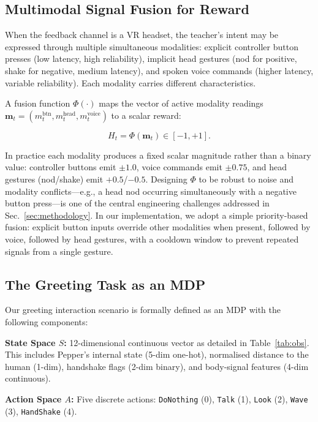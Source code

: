 \documentclass[../report.tex]{subfiles}
\begin{document}
    \subsection{Multimodal Signal Fusion for Reward}

    When the feedback channel is a VR headset, the teacher's intent may be expressed through multiple simultaneous modalities: explicit controller button presses (low latency, high reliability), implicit head gestures (nod for positive, shake for negative, medium latency), and spoken voice commands (higher latency, variable reliability). Each modality carries different characteristics.

    A fusion function $\Phi(\cdot)$ maps the vector of active modality readings $\mathbf{m}_t = (m^{\text{btn}}_t, m^{\text{head}}_t, m^{\text{voice}}_t)$ to a scalar reward:

    \begin{equation}
        H_t = \Phi(\mathbf{m}_t) \in [-1, +1].
        \label{eq:fusion}
    \end{equation}

    In practice each modality produces a fixed scalar magnitude rather than a binary value: controller buttons emit $\pm1.0$, voice commands emit $\pm0.75$, and head gestures (nod/shake) emit $+0.5$/$-0.5$. Designing $\Phi$ to be robust to noise and modality conflicts---e.g., a head nod occurring simultaneously with a negative button press---is one of the central engineering challenges addressed in Sec.~\ref{sec:methodology}. In our implementation, we adopt a simple priority-based fusion: explicit button inputs override other modalities when present, followed by voice, followed by head gestures, with a cooldown window to prevent repeated signals from a single gesture.

    \subsection{The Greeting Task as an MDP}

    Our greeting interaction scenario is formally defined as an MDP with the following components:

    \textbf{State Space $S$:} 12-dimensional continuous vector as detailed in Table~\ref{tab:obs}. This includes Pepper's internal state (5-dim one-hot), normalised distance to the human (1-dim), handshake flags (2-dim binary), and body-signal features (4-dim continuous).

    \textbf{Action Space $A$:} Five discrete actions: \texttt{DoNothing} (0), \texttt{Talk} (1), \texttt{Look} (2), \texttt{Wave} (3), \texttt{HandShake} (4).
\end{document}
